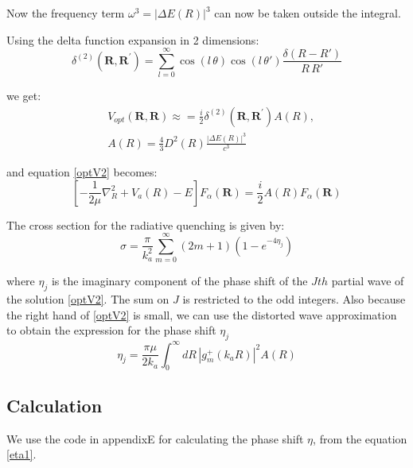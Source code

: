 Now the frequency term $ \omega^3 = \left|\Delta E(R)\right|^3 $ can now be taken outside the integral.

Using the delta function expansion in 2 dimensions: 
\begin{equation}
\delta^{(2)}\left(\mathbf{R},\mathbf{R}^{'}\right) = \sum_{l=0}^{\infty}{\cos(l\,\theta)\cos(l\,\theta')\frac{\delta(R - R')}{R\,R'}}
\end{equation}

we get:
\begin{equation}
\begin{split}
    & V_{opt}(\mathbf{R},\mathbf{R}) \approx = \frac{i}{2}\delta^{(2)}\left(\mathbf{R},\mathbf{R}^{'}\right)A(R), \\[.8em]
& A(R) = \frac{4}{3}D^2(R)\frac{\left|\Delta E(R)\right|^3}{c^3}
\end{split}
\end{equation}

and equation \eqref{optV2} becomes:
\begin{equation}\label{optApprox1}
\left[-\frac{1}{2\mu}\nabla_R^2 + V_a(R) - E\right]F_{\alpha}(\mathbf{R}) = \frac{i}{2}A(R)F_{\alpha}(\mathbf{R})
\end{equation}

The cross section for the radiative quenching is given by:
\begin{equation}
\sigma = \frac{\pi}{k_a^2}\sum_{m=0}^{\infty}{(2m+1)\left(1-e^{-4\eta_j}\right) }
\end{equation}

where $ \eta_j $ is the imaginary component of the phase shift of the $ Jth $ partial wave of the solution \eqref{optV2}. The sum on $ J $ is restricted to the odd integers. 
Also because the right hand of \eqref{optV2} is small, we can use the distorted wave approximation to obtain the expression for the phase shift $ \eta_j $
\begin{equation}\label{eta1}
\eta_j = \frac{\pi\mu}{2k_a}\int_0^{\infty}{dR\,\left|g_m^{+}\left(k_aR\right)\right|^2A(R) }
\end{equation}

\subsection{Calculation} \label{QuenchingCalculation}

We use the code in appendixE for calculating the phase shift $ \eta $, from the equation \eqref{eta1}.

